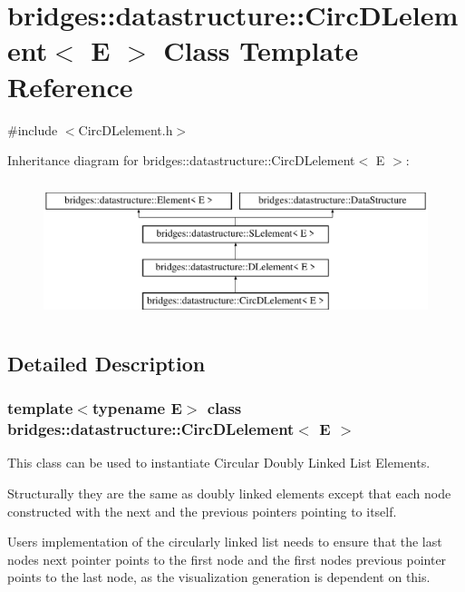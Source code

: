 \hypertarget{classbridges_1_1datastructure_1_1_circ_d_lelement}{}\section{bridges\+::datastructure\+::Circ\+D\+Lelement$<$ E $>$ Class Template Reference}
\label{classbridges_1_1datastructure_1_1_circ_d_lelement}


{\ttfamily \#include $<$Circ\+D\+Lelement.\+h$>$}

Inheritance diagram for bridges\+::datastructure\+::Circ\+D\+Lelement$<$ E $>$\+:\begin{figure}[H]
\begin{center}
\leavevmode
\includegraphics[height=4.000000cm]{classbridges_1_1datastructure_1_1_circ_d_lelement}
\end{center}
\end{figure}


\subsection{Detailed Description}
\subsubsection*{template$<$typename E$>$\newline
class bridges\+::datastructure\+::\+Circ\+D\+Lelement$<$ E $>$}

This class can be used to instantiate Circular Doubly Linked List Elements. 

Structurally they are the same as doubly linked elements except that each node constructed with the next and the previous pointers pointing to itself.

User\textquotesingle{}s implementation of the circularly linked list needs to ensure that the last node\textquotesingle{}s next pointer points to the first node and the first node\textquotesingle{}s previous pointer points to the last node, as the visualization generation is dependent on this.

